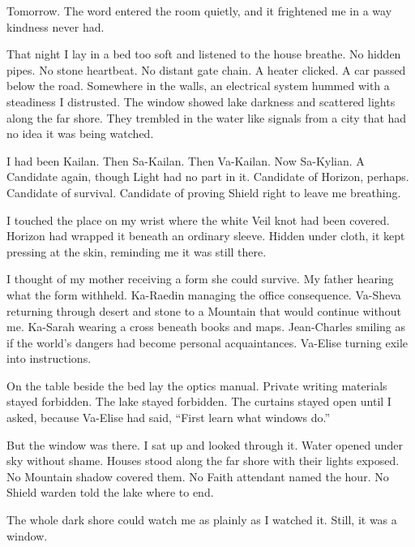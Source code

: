 Tomorrow. The word entered the room quietly, and it frightened me in a way kindness never had.\par

\ornament

That night I lay in a bed too soft and listened to the house breathe. No hidden pipes. No stone heartbeat. No distant gate chain. A heater clicked. A car passed below the road. Somewhere in the walls, an electrical system hummed with a steadiness I distrusted. The window showed lake darkness and scattered lights along the far shore. They trembled in the water like signals from a city that had no idea it was being watched.\par

I had been Kailan. Then Sa-Kailan. Then Va-Kailan. Now Sa-Kylian. A Candidate again, though Light had no part in it. Candidate of Horizon, perhaps. Candidate of survival. Candidate of proving Shield right to leave me breathing.\par

I touched the place on my wrist where the white Veil knot had been covered. Horizon had wrapped it beneath an ordinary sleeve. Hidden under cloth, it kept pressing at the skin, reminding me it was still there.\par

I thought of my mother receiving a form she could survive. My father hearing what the form withheld. Ka-Raedin managing the office consequence. Va-Sheva returning through desert and stone to a Mountain that would continue without me. Ka-Sarah wearing a cross beneath books and maps. Jean-Charles smiling as if the world's dangers had become personal acquaintances. Va-Elise turning exile into instructions.\par

On the table beside the bed lay the optics manual. Private writing materials stayed forbidden. The lake stayed forbidden. The curtains stayed open until I asked, because Va-Elise had said, ``First learn what windows do.''\par

But the window was there. I sat up and looked through it. Water opened under sky without shame. Houses stood along the far shore with their lights exposed. No Mountain shadow covered them. No Faith attendant named the hour. No Shield warden told the lake where to end.\par

The whole dark shore could watch me as plainly as I watched it. Still, it was a window.\par

